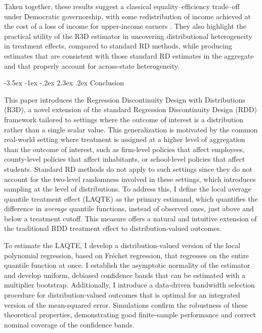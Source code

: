 \documentclass[12pt]{article}
\makeatletter
\renewcommand\section{\@startsection{section}{1}{\z@}%
  {-3.5ex \@plus -1ex \@minus -.2ex}%
  {2.3ex \@plus.2ex}%
  {\bfseries\large\center}} %
\makeatother
\begin{document}
Taken together, these results suggest a classical equality--efficiency trade--off under Democratic governorship, with  some redistribution of income achieved at the cost of a loss of income for upper-income earners \citep{okun1975equality}. They also highlight the practical utility of the R3D estimator in uncovering distributional heterogeneity in treatment effects, compared to standard RD methods, while producing estimates that are consistent with those standard RD estimates in the aggregate and that properly account for across-state heterogeneity. 


\section{Conclusion}

This paper introduces the Regression Discontinuity Design with Distributions (R3D), a novel extension of the standard Regression Discontinuity Design (RDD) framework tailored to settings where the outcome of interest is a distribution rather than a single scalar value. This generalization is motivated by the common real-world setting where treatment is assigned at a higher level of aggregation than the outcome of interest, such as firm-level policies that affect employees, county-level policies that affect inhabitants, or school-level policies that affect students. Standard RD methods do not apply to such settings since they do not account for the two-level randomness involved in these settings, which introduces sampling at the level of distributions. To address this, I define the local average quantile treatment effect (LAQTE) as the primary estimand, which quantifies the difference in \emph{average} quantile functions, instead of observed ones, just above and below a treatment cutoff. This measure offers a natural and intuitive extension of the traditional RDD treatment effect to distribution-valued outcomes.

To estimate the LAQTE, I develop a distribution-valued version of the local polynomial regression, based on Fr\'echet regression, that regresses on the entire quantile function at once. I establish the asymptotic normality of the estimator and develop uniform, debiased confidence bands that can be estimated with a multiplier bootstrap. Additionally, I introduce a data-driven bandwidth selection procedure for distribution-valued outcomes that is optimal for an integrated version of the mean-squared error. Simulations confirm the robustness of these theoretical properties, demonstrating good finite-sample performance and correct nominal coverage of the confidence bands.
\end{document}
